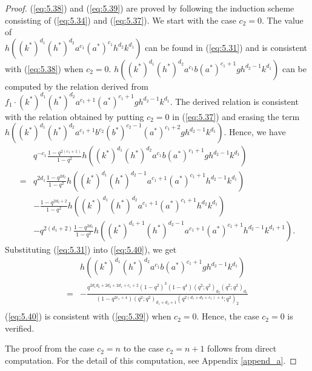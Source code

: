 \documentclass[table,a4paper,reqno]{amsart}
\numberwithin{equation}{section}
\theoremstyle{definition}
\begin{document}
\begin{proof}
    (\ref{eq:5.38}) and (\ref{eq:5.39}) are proved by following the induction scheme consisting of (\ref{eq:5.34}) and (\ref{eq:5.37}). We start with the case $c_2=0$. The value of \\$h\left((k^*)^{d_1}(h^*)^{d_2}a^{c_1}(a^*)^{c_1}h^{d_2}k^{d_1}\right)$ can be found in (\ref{eq:5.31}) and is consistent with (\ref{eq:5.38}) when $c_2=0$. $h\left((k^*)^{d_1}(h^*)^{d_2}a^{c_1}b(a^*)^{c_1+1}gh^{d_2-1}k^{d_1}\right)$ can be computed by the relation derived from $f_1\cdot (k^*)^{d_1}(h^*)^{d_2}a^{c_1+1}(a^*)^{c_1+1}gh^{d_2-1}k^{d_1}$. The derived relation is consistent with the relation obtained by putting $c_2=0$ in (\ref{eq:5.37}) and erasing the term $h\left((k^*)^{d_1}(h^*)^{d_2}a^{c_1+1}b^{c_2}(b^*)^{c_2-1}(a^*)^{c_1+2}gh^{d_2-1}k^{d_1}\right)$. Hence, we have
    \begin{equation}\label{eq:5.40}
        \begin{split}
        &q^{-c_1}\frac{1-q^{2(c_1+1)}}{1-q^2}h\left((k^*)^{d_1}(h^*)^{d_2}a^{c_1}b(a^*)^{c_1+1}gh^{d_2-1}k^{d_1}\right)\\
        =&q^{2d_1}\frac{1-q^{2d_2}}{1-q^2}h\left((k^*)^{d_1}(h^*)^{d_2-1}a^{c_1+1}(a^*)^{c_1+1}h^{d_2-1}k^{d_1}\right)\\
        &-\frac{1-q^{2d_2+2}}{1-q^2}h\left((k^*)^{d_1}(h^*)^{d_2}a^{c_1+1}(a^*)^{c_1+1}h^{d_2}k^{d_1}\right)\\
        &-q^{2(d_1+2)}\frac{1-q^{2d_2}}{1-q^2}h\left((k^*)^{d_1+1}(h^*)^{d_2-1}a^{c_1+1}(a^*)^{c_1+1}h^{d_2-1}k^{d_1+1}\right).
        \end{split}
    \end{equation}
    Substituting (\ref{eq:5.31}) into (\ref{eq:5.40}), we get
    \begin{equation}\label{eq:5.41}
        \begin{split}
        &h\left((k^*)^{d_1}(h^*)^{d_2}a^{c_1}b(a^*)^{c_1+1}gh^{d_2-1}k^{d_1}\right)\\
        =&-\frac{q^{2d_1d_2+2d_2+2d_1+c_1+2}(1-q^2)^3(1-q^4)(q^2;q^2)_{d_2}(q^2;q^2)_{d_1}}{(1-q^{2c_1+4})(q^2;q^2)_{d_1+d_2+1}(q^{2(d_1+d_2+c_1)+4};q^2)_{2}}\\
        \end{split}
    \end{equation}
     (\ref{eq:5.40}) is consistent with (\ref{eq:5.39}) when $c_2=0$. Hence, the case $c_2=0$ is verified.

     The proof from the case $c_2=n$ to the case $c_2=n+1$ follows from direct computation. For the detail of this computation, see Appendix \ref{append_a}.
\end{proof}
\end{document}
